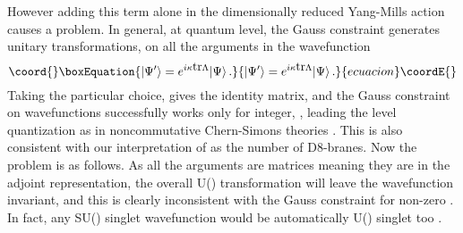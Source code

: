 \documentclass[a4paper,12pt]{article}
\def\tr{\mbox{tr}}
\begin{document}
However adding this term alone in  the  dimensionally reduced Yang-Mills action causes a problem. In general, at
quantum level, the Gauss constraint generates unitary transformations,
\coordHE{} on all the arguments in the wavefunction \cite{0101029}
\begin{equation}\coord{}\boxEquation{
|\Psi^{\prime}\rangle=e^{i\kappa\tr\Lambda}|\Psi\rangle\,.
}{
|\Psi^{\prime}\rangle=e^{i\kappa\tr\Lambda}|\Psi\rangle\,.
}{ecuacion}\coordE{}\end{equation}
Taking the particular choice, \coordHE{}  gives the identity matrix, \coordHE{} and  the Gauss constraint on wavefunctions successfully works only  for integer, \myHighlight{$\kappa$}\coordHE{}, leading the level
quantization as in noncommutative Chern-Simons theories \cite{0102188}. This is also consistent with our
interpretation of \myHighlight{$\kappa$}\coordHE{} as the number of D8-branes. Now the problem is as follows. As all the arguments are
matrices meaning they are in the adjoint representation, the overall U(\coordHE{}) transformation will leave the
wavefunction invariant, and this is clearly  inconsistent  with the Gauss constraint for non-zero \myHighlight{$\kappa$}\coordHE{}. In
fact, any SU(\coordHE{}) singlet wavefunction would be  automatically U(\coordHE{}) singlet too \cite{9712086}.\newline
\end{document}
